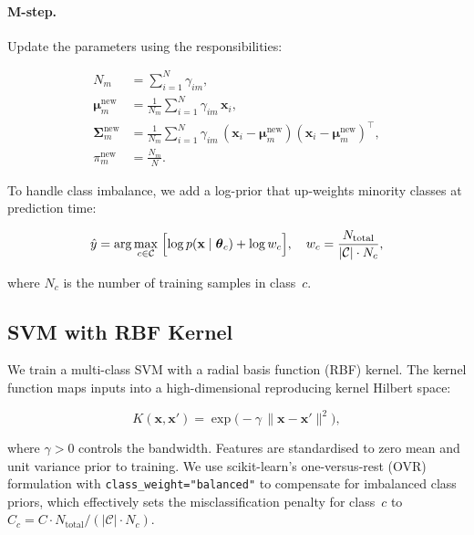 \documentclass[conference]{IEEEtran}
\begin{document}
\paragraph{M-step.}  Update the parameters using the responsibilities:

\begin{align}
  N_m &= \sum_{i=1}^{N} \gamma_{im}, \label{eq:mstep_n} \\[4pt]
  \boldsymbol{\mu}_m^{\text{new}} &=
    \frac{1}{N_m} \sum_{i=1}^{N} \gamma_{im}\,\mathbf{x}_i,
    \label{eq:mstep_mu} \\[4pt]
  \boldsymbol{\Sigma}_m^{\text{new}} &=
    \frac{1}{N_m} \sum_{i=1}^{N} \gamma_{im}\,
    (\mathbf{x}_i - \boldsymbol{\mu}_m^{\text{new}})
    (\mathbf{x}_i - \boldsymbol{\mu}_m^{\text{new}})^\top,
    \label{eq:mstep_sigma} \\[4pt]
  \pi_m^{\text{new}} &= \frac{N_m}{N}.
  \label{eq:mstep_pi}
\end{align}

\noindent
To handle class imbalance, we add a log-prior that up-weights minority
classes at prediction time:

\begin{equation}
  \hat{y} = \arg\max_{c \in \mathcal{C}} \;
    \Bigl[\log p(\mathbf{x} \mid \boldsymbol{\theta}_c)
          + \log w_c\Bigr],
  \quad w_c = \frac{N_{\text{total}}}{|\mathcal{C}| \cdot N_c},
  \label{eq:gmm_pred}
\end{equation}

\noindent
where $N_c$ is the number of training samples in class~$c$.

\subsection{SVM with RBF Kernel}
\label{sec:svm}

We train a multi-class SVM with a radial basis function (RBF) kernel.
The kernel function maps inputs into a high-dimensional reproducing
kernel Hilbert space:

\begin{equation}
  K(\mathbf{x}, \mathbf{x}') =
    \exp\!\bigl(-\gamma \,\|\mathbf{x} - \mathbf{x}'\|^2\bigr),
  \label{eq:rbf}
\end{equation}

\noindent
where $\gamma > 0$ controls the bandwidth.  Features are standardised
to zero mean and unit variance prior to training.  We use scikit-learn's
one-versus-rest (OVR) formulation with \texttt{class\_weight="balanced"}
to compensate for imbalanced class priors, which effectively sets the
misclassification penalty for class~$c$ to
$C_c = C \cdot N_{\text{total}} / (|\mathcal{C}| \cdot N_c)$.
\end{document}
